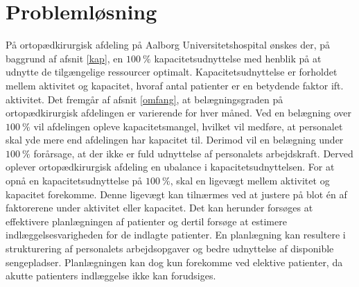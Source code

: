 \chapter{Problemløsning}
På ortopædkirurgisk afdeling på Aalborg Universitetshospital ønskes der, på baggrund af afsnit \ref{kap}, en $100~\%$ kapacitetsudnyttelse med henblik på at udnytte de tilgængelige ressourcer optimalt. Kapacitetsudnyttelse er forholdet mellem aktivitet og kapacitet, hvoraf antal patienter er en betydende faktor ift. aktivitet. 
Det fremgår af afsnit \ref{omfang}, at belægningsgraden på ortopædkirurgisk afdelingen er varierende for hver måned. Ved en belægning over $100~\%$ vil afdelingen opleve kapacitetsmangel, hvilket vil medføre, at personalet skal yde mere end afdelingen har kapacitet til. Derimod vil en belægning under $100~\%$ forårsage, at der ikke er fuld udnyttelse af personalets arbejdskraft. Derved oplever ortopædkirurgisk afdeling en ubalance i kapacitetsudnyttelsen. 
For at opnå en kapacitetsudnyttelse på $100~\%$, skal en ligevægt mellem aktivitet og kapacitet forekomme. Denne ligevægt kan tilnærmes ved at justere på blot én af faktorerene under aktivitet eller kapacitet\cite{Bames2015}. Det kan herunder forsøges at effektivere planlægningen af patienter og dertil forsøge at estimere indlæggelsesvarigheden for de indlagte patienter. En planlægning kan resultere i strukturering af personalets arbejdsopgaver og bedre udnyttelse af disponible sengepladser. Planlægningen kan dog kun forekomme ved elektive patienter, da akutte patienters indlæggelse ikke kan forudsiges. 



